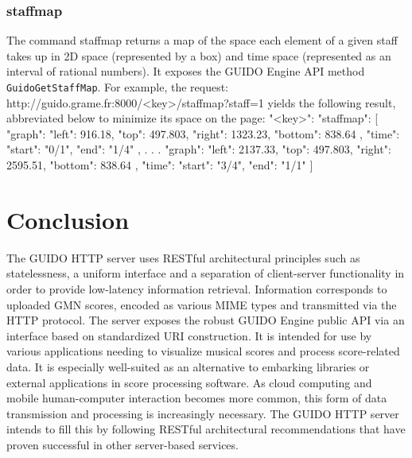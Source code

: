 \documentclass[11pt,a4paper]{article}
\newenvironment{code}		{\vspace{-2mm} \fontsize{8.5pt}{12pt}\selectfont \verbatim}{\endverbatim\vspace{-2mm}}
\newenvironment{mcode}		{\vspace{-2mm} \fontsize{10pt}{12pt}\selectfont \verbatim}{\endverbatim\vspace{-2mm}}
\begin{document}
\subsubsection{staffmap}\label{subsection:staffmap}
The command staffmap returns a map of the space each element of a given staff takes up in 2D space (represented by a box) and time space (represented as an interval of rational numbers).  It exposes the GUIDO Engine API method \verb=GuidoGetStaffMap=.  For example, the request:
\begin{code}
 http://guido.grame.fr:8000/<key>/staffmap?staff=1
\end{code}
yields the following result, abbreviated below to minimize its space on the page:
\begin{mcode}
{
  "<key>": {
    "staffmap": [
      {
        "graph": {
          "left": 916.18,
          "top": 497.803,
          "right": 1323.23,
          "bottom": 838.64
        },
        "time": {
          "start": "0/1",
          "end": "1/4"
        }
      },
      .
      .
      .
      {
        "graph": {
          "left": 2137.33,
          "top": 497.803,
          "right": 2595.51,
          "bottom": 838.64
        },
        "time": {
          "start": "3/4",
          "end": "1/1"
        }
      }
    ]
  }
}
\end{mcode}

\section{Conclusion}
The GUIDO HTTP server uses RESTful architectural principles such as statelessness, a uniform interface and a separation of client-server functionality in order to provide low-latency information retrieval.  Information corresponds to uploaded GMN scores, encoded as various MIME types and transmitted via the HTTP protocol.  The server exposes the robust GUIDO Engine public API via an interface based on standardized URI construction.  It is intended for use by various applications needing to visualize musical scores and process score-related data.  It is especially well-suited as an alternative to embarking libraries or external applications in score processing software.  As cloud computing and mobile human-computer interaction becomes more common, this form of data transmission and processing is increasingly necessary.  The GUIDO HTTP server intends to fill this by following RESTful architectural recommendations that have proven successful in other server-based services.
\end{document}
